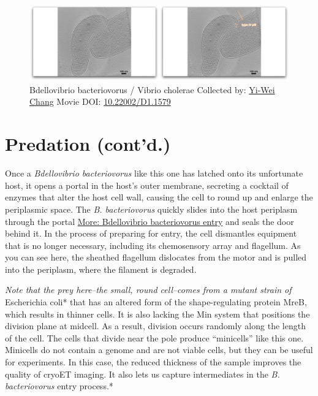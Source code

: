 \documentclass[]{tufte-book}
\begin{document}
\begin{figure}
\includegraphics{movie_stills/9_9} \caption[Bdellovibrio bacteriovorus / Vibrio cholerae Collected by:
\protect\hyperlink{yi-wei_chang}{Yi-Wei Chang} Movie DOI:
\href{https://doi.org/10.22002/D1.1579}{10.22002/D1.1579}]{Bdellovibrio bacteriovorus / Vibrio cholerae Collected by:
\protect\hyperlink{yi-wei_chang}{Yi-Wei Chang} Movie DOI:
\href{https://doi.org/10.22002/D1.1579}{10.22002/D1.1579}}\label{fig:9-9}
\end{figure}

\section{Predation (cont'd.)}\label{predation-contd.}

Once a \emph{Bdellovibrio bacteriovorus} like this one has latched onto
its unfortunate host, it opens a portal in the host's outer membrane,
secreting a cocktail of enzymes that alter the host cell wall, causing
the cell to round up and enlarge the periplasmic space. The \emph{B.
bacteriovorus} quickly slides into the host periplasm through the portal
\protect\hyperlink{Bdellovibrio_bacteriovorus_entry}{More: Bdellovibrio
bacteriovorus entry} and seals the door behind it. In the process of
preparing for entry, the cell dismantles equipment that is no longer
necessary, including its chemosensory array and flagellum. As you can
see here, the sheathed flagellum dislocates from the motor and is pulled
into the periplasm, where the filament is degraded.

\emph{Note that the prey here--the small, round cell--comes from a
mutant strain of }Escherichia coli* that has an altered form of the
shape-regulating protein MreB, which results in thinner cells. It is
also lacking the Min system that positions the division plane at
midcell. As a result, division occurs randomly along the length of the
cell. The cells that divide near the pole produce ``minicells'' like
this one. Minicells do not contain a genome and are not viable cells,
but they can be useful for experiments. In this case, the reduced
thickness of the sample improves the quality of cryoET imaging. It also
lets us capture intermediates in the \emph{B. bacteriovorus} entry
process.*
\end{document}
